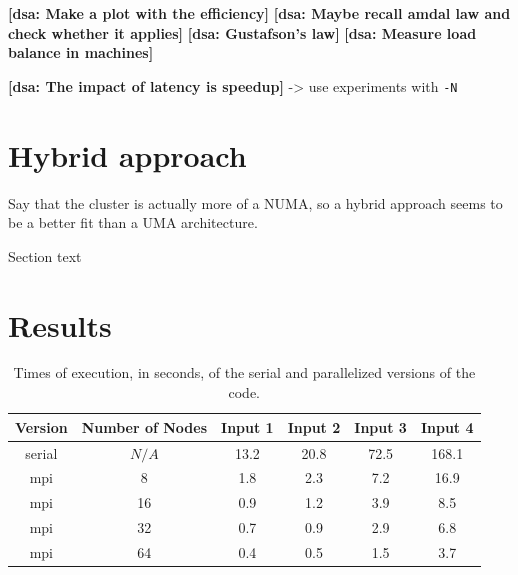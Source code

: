 \documentclass{article}
\newcommand{\dsanote}[1]{\textbf{[dsa: #1]}}
\begin{document}
\dsanote{Make a plot with the efficiency}
\dsanote{Maybe recall amdal law and check whether it applies}
\dsanote{Gustafson's law}
\dsanote{Measure load balance in machines}

\dsanote{The impact of latency is speedup} -> use experiments with \texttt{-N}



\section{Hybrid approach}

Say that the cluster is actually more of a NUMA, so a hybrid approach seems
to be a better fit than a UMA architecture.

Section text

\section{Results}

\begin{table}[h!]
	\centering
	\begin{tabular}{||c c c c c c||} 
	 \hline
	 Version & Number of Nodes & Input 1 & Input 2 & Input 3 & Input 4\\ [0.5ex] 
	 \hline\hline
	 serial & $N/A$ & 13.2 & 20.8 & 72.5 & 168.1 \\ 
	 mpi & 8 & 1.8 & 2.3 & 7.2 & 16.9 \\ 
	 mpi & 16 & 0.9 & 1.2 & 3.9 & 8.5  \\
	 mpi & 32 & 0.7 & 0.9 & 2.9 & 6.8 \\
	 mpi & 64 & 0.4 & 0.5 & 1.5 & 3.7 \\ [1ex] 
	 \hline
	\end{tabular}
	\caption{Times of execution, in seconds, of the serial and parallelized versions of the code.}
	\label{execution-times}
\end{table}
\end{document}

